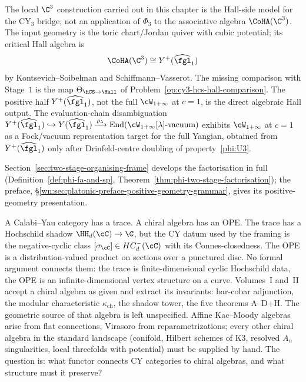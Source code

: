 \begin{remark}
\label{rem:two-stage-equals-coha-yangian}
The local $\C^3$ construction carried out in this chapter is the
Hall-side model for the CY$_3$ bridge, not an application of $\Phi_3$ to
the associative algebra $\CoHA(\C^3)$. The input geometry is the toric
chart/Jordan quiver with cubic potential; its critical Hall algebra is
\[
 \CoHA(\C^3)\cong Y^+(\widehat{\fgl}_1)
\]
by Kontsevich--Soibelman and Schiffmann--Vasserot. The missing
comparison with Stage~$1$ is the map
$\Theta_{\hCS\to\Hall}$ of Problem~\ref{op:cy3-hcs-hall-comparison}.
The positive half $Y^+(\widehat{\fgl}_1)$, not the full
$\cW_{1+\infty}$ at $c = 1$, is the direct algebraic Hall output.
The evaluation-chain disambiguation
$Y^+(\widehat{\fgl}_1) \hookrightarrow
Y(\widehat{\fgl}_1) \xrightarrow{\rho_\lambda}
\mathrm{End}(\cW_{1+\infty}[\lambda]\textup{-vacuum})$ exhibits
$\cW_{1+\infty}$ at $c = 1$ as a Fock/vacuum representation target for
the full Yangian, obtained from $Y^+(\widehat{\fgl}_1)$ only after
Drinfeld-centre doubling of property~\eqref{phi:U3}.
\end{remark}

Section~\ref{sec:two-stage-organising-frame} develops the factorisation in full (Definition~\ref{def:phi-fa-and-sp}, Theorem~\ref{thm:phi-two-stage-factorisation}); the preface, \S\ref{wn:sec:platonic-preface-positive-geometry-grammar}, gives its positive-geometry presentation.

A Calabi--Yau category has a trace. A chiral algebra has an OPE. The trace has a Hochschild shadow $\HH_d(\cC)\to\C$, but the CY datum used by the framing is the negative-cyclic class $[\sigma_\cC]\in HC^-_d(\cC)$ with its Connes-closedness. The OPE is a distribution-valued product on sections over a punctured disc. No formal argument connects them: the trace is finite-dimensional cyclic Hochschild data, the OPE is an infinite-dimensional vertex structure on a curve. Volumes~I and~II accept a chiral algebra as given and extract its invariants: bar-cobar adjunction, the modular characteristic $\kappa_{\mathrm{ch}}$, the shadow tower, the five theorems A--D+H. The geometric source of that algebra is left unspecified. Affine Kac--Moody algebras arise from flat connections, Virasoro from reparametrizations; every other chiral algebra in the standard landscape (conifold, Hilbert schemes of K3, resolved $A_n$ singularities, local threefolds with potential) must be supplied by hand. The question is: what functor connects CY categories to chiral algebras, and what structure must it preserve?

